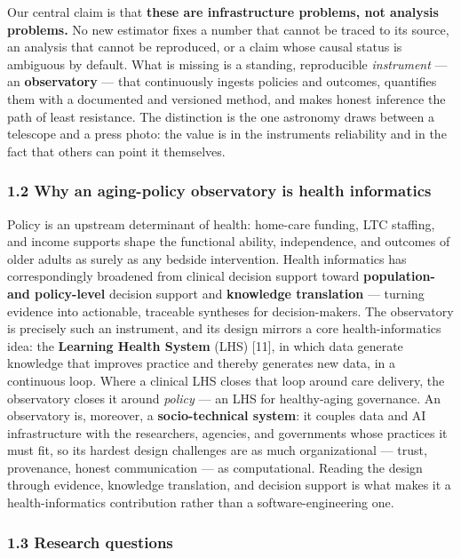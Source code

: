 \documentclass[
  11pt,
]{article}
\begin{document}
Our central claim is that \textbf{these are infrastructure problems, not
analysis problems.} No new estimator fixes a number that cannot be
traced to its source, an analysis that cannot be reproduced, or a claim
whose causal status is ambiguous by default. What is missing is a
standing, reproducible \emph{instrument} --- an \textbf{observatory} ---
that continuously ingests policies and outcomes, quantifies them with a
documented and versioned method, and makes honest inference the path of
least resistance. The distinction is the one astronomy draws between a
telescope and a press photo: the value is in the
instrument\textquotesingle s reliability and in the fact that others can
point it themselves.

\hypertarget{12-why-an-aging-policy-observatory-is-health-informatics}{%
\subsubsection{1.2 Why an aging-policy observatory is health
informatics}\label{12-why-an-aging-policy-observatory-is-health-informatics}}

Policy is an upstream determinant of health: home-care funding, LTC
staffing, and income supports shape the functional ability,
independence, and outcomes of older adults as surely as any bedside
intervention. Health informatics has correspondingly broadened from
clinical decision support toward \textbf{population- and policy-level}
decision support and \textbf{knowledge translation} --- turning evidence
into actionable, traceable syntheses for decision-makers. The
observatory is precisely such an instrument, and its design mirrors a
core health-informatics idea: the \textbf{Learning Health System} (LHS)
{[}11{]}, in which data generate knowledge that improves practice and
thereby generates new data, in a continuous loop. Where a clinical LHS
closes that loop around care delivery, the observatory closes it around
\emph{policy} --- an LHS for healthy-aging governance. An observatory
is, moreover, a \textbf{socio-technical system}: it couples data and AI
infrastructure with the researchers, agencies, and governments whose
practices it must fit, so its hardest design challenges are as much
organizational --- trust, provenance, honest communication --- as
computational. Reading the design through evidence, knowledge
translation, and decision support is what makes it a health-informatics
contribution rather than a software-engineering one.

\hypertarget{13-research-questions}{%
\subsubsection{1.3 Research questions}\label{13-research-questions}}
\end{document}
